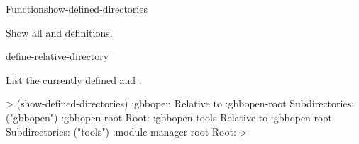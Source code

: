 \documentclass[10pt,twoside,english,pdftex]{article}
\begin{document}
\begin{functiondoc}{Function}{show-defined-directories}{\noargs}
%
%

\fnsyntax

\fnpurpose Show all  and  definitions.

\fnpackage {}

\fnmodule {}

\begin{alsos}{define-relative-directory}
\end{alsos}

\fnexample 
%
List the currently defined  and :
%
\begin{example}
%
\W\supp
  > (show-defined-directories)
  :gbbopen
      Relative to :gbbopen-root
      Subdirectories: ("gbbopen")
  :gbbopen-root
      Root: 
  :gbbopen-tools
      Relative to :gbbopen-root
      Subdirectories: ("tools")
  :module-manager-root
      Root: 
  >
\end{example}

\end{functiondoc}

\end{document}
